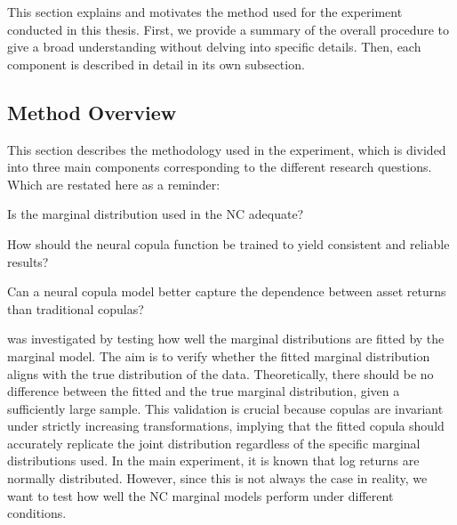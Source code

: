 This section explains and motivates the method used for the experiment conducted in this thesis. First, we provide a summary of the overall procedure to give a broad understanding without delving into specific details. Then, each component is described in detail in its own subsection.


\subsection{Method Overview}
This section describes the methodology used in the experiment, which is divided into three main components corresponding to the different research questions. Which are restated here as a reminder:
\begin{compactenum}[{\bfseries RQ}1]
    \item Is the marginal distribution used in the \gls{NC} adequate?
    \item How should the neural copula function be trained to yield consistent and reliable results?
    \item Can a neural copula model better capture the dependence between asset returns than traditional copulas?
\end{compactenum}

\RQone was investigated by testing how well the marginal distributions are fitted by the marginal model. The aim is to verify whether the fitted marginal distribution aligns with the true distribution of the data. Theoretically, there should be no difference between the fitted and the true marginal distribution, given a sufficiently large sample. This validation is crucial because copulas are invariant under strictly increasing transformations, implying that the fitted copula should accurately replicate the joint distribution regardless of the specific marginal distributions used. In the main experiment, it is known that log returns are normally distributed. However, since this is not always the case in reality, we want to test how well the \gls{NC} marginal models perform under different conditions.


